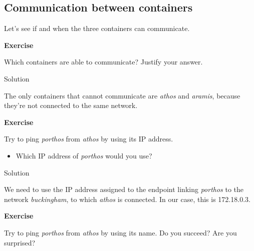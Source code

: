 \documentclass[
]{article}
\providecommand{\tightlist}{%
  \setlength{\itemsep}{0pt}\setlength{\parskip}{0pt}}
\newenvironment{infobox}[1]
  {
  \begin{itemize}
  \renewcommand{\labelitemi}{
    \raisebox{-.7\height}[0pt][0pt]{
      
    }
  }
  \setlength{\fboxsep}{1em}
  \begin{whitebox}
  \item
  }
  {
  \end{whitebox}
  \end{itemize}
  }
\theoremstyle{definition}
\theoremstyle{definition}
\theoremstyle{definition}
\theoremstyle{remark}
\let\BeginKnitrBlock\begin \let\EndKnitrBlock\end
\begin{document}
\hypertarget{communication-between-containers}{%
\subsection{Communication between containers}\label{communication-between-containers}}

Let's see if and when the three containers can communicate.

\begin{infobox}{exercisebox}

\textbf{Exercise}

\BeginKnitrBlock{exercise}
\protect\hypertarget{exr:unnamed-chunk-36}{}{\label{exr:unnamed-chunk-36} }Which containers are able to communicate?
Justify your answer.
\EndKnitrBlock{exercise}

\end{infobox}

Solution

\begin{infobox}{exercisebox}

The only containers that cannot communicate are \emph{athos} and \emph{aramis},
because they're not connected to the same network.

\end{infobox}

\begin{infobox}{exercisebox}

\textbf{Exercise}

\BeginKnitrBlock{exercise}
\protect\hypertarget{exr:unnamed-chunk-37}{}{\label{exr:unnamed-chunk-37} }Try to ping \emph{porthos} from \emph{athos} by using its IP address.

\begin{itemize}
\tightlist
\item
  Which IP address of \emph{porthos} would you use?
\end{itemize}
\EndKnitrBlock{exercise}

\end{infobox}

Solution

\begin{infobox}{exercisebox}

We need to use the IP address assigned to the endpoint linking
\emph{porthos} to the network \emph{buckingham}, to which \emph{athos} is connected.
In our case, this is 172.18.0.3.

\end{infobox}

\begin{infobox}{exercisebox}

\textbf{Exercise}

\BeginKnitrBlock{exercise}
\protect\hypertarget{exr:unnamed-chunk-38}{}{\label{exr:unnamed-chunk-38} }Try to ping \emph{porthos} from \emph{athos} by using its name.
Do you succeed? Are you surprised?
\EndKnitrBlock{exercise}

\end{infobox}
\end{document}
